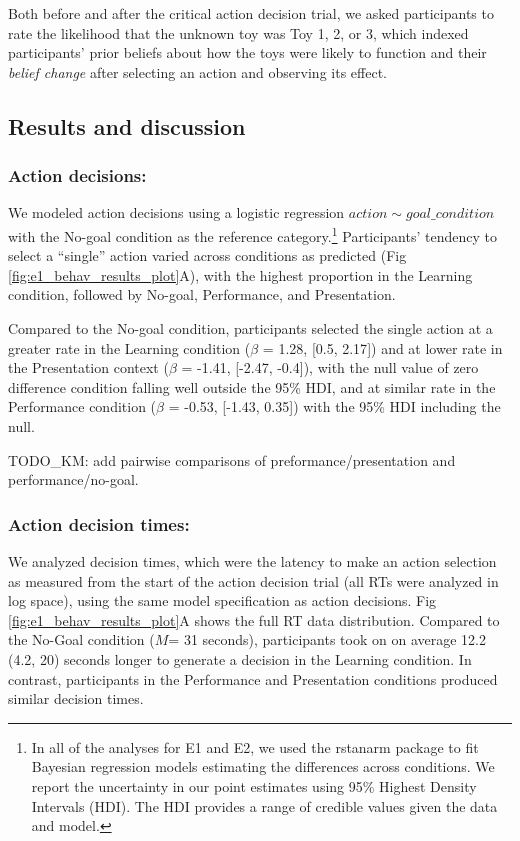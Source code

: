 \documentclass[10pt, letterpaper]{article}
\begin{document}
Both before and after the critical action decision trial, we asked
participants to rate the likelihood that the unknown toy was Toy 1, 2,
or 3, which indexed participants' prior beliefs about how the toys were
likely to function and their \emph{belief change} after selecting an
action and observing its effect.

\subsection{Results and discussion}\label{results-and-discussion}

\subsubsection{Action decisions:}\label{action-decisions}

We modeled action decisions using a logistic regression
\texttt{$action \sim goal\_condition$} with the No-goal condition as the
reference
category.\footnote{In all of the analyses for E1 and E2, we used the {\selectfont rstanarm} package to fit Bayesian regression models estimating the differences across conditions. We report the uncertainty in our point estimates using 95\% Highest Density Intervals (HDI). The HDI provides a range of credible values given the data and model.}
Participants' tendency to select a ``single'' action varied across
conditions as predicted (Fig \ref{fig:e1_behav_results_plot}A), with the
highest proportion in the Learning condition, followed by No-goal,
Performance, and Presentation.

Compared to the No-goal condition, participants selected the single
action at a greater rate in the Learning condition (\(\beta\) = 1.28,
{[}0.5, 2.17{]}) and at lower rate in the Presentation context
(\(\beta\) = -1.41, {[}-2.47, -0.4{]}), with the null value of zero
difference condition falling well outside the 95\% HDI, and at similar
rate in the Performance condition (\(\beta\) = -0.53, {[}-1.43, 0.35{]})
with the 95\% HDI including the null.

TODO\_KM: add pairwise comparisons of preformance/presentation and
performance/no-goal.

\subsubsection{Action decision times:}\label{action-decision-times}

We analyzed decision times, which were the latency to make an action
selection as measured from the start of the action decision trial (all
RTs were analyzed in log space), using the same model specification as
action decisions. Fig \ref{fig:e1_behav_results_plot}A shows the full RT
data distribution. Compared to the No-Goal condition (\(M\)= 31
seconds), participants took on on average 12.2 (4.2, 20) seconds longer
to generate a decision in the Learning condition. In contrast,
participants in the Performance and Presentation conditions produced
similar decision times.
\end{document}
